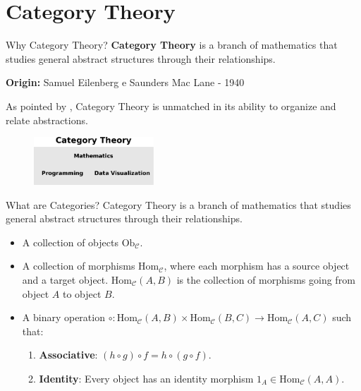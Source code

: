 \documentclass[aspectratio=169,xcolor=dvipsnames,10pt]{beamer}
\theoremstyle{definition}
\begin{document}
\section{Category Theory}
\begin{frame}[fragile]{Why Category Theory?}
	\textbf{Category Theory} is a branch of mathematics that
	studies general abstract structures through their relationships.
	\vspace{3mm}

	\textbf{Origin: }Samuel Eilenberg e Saunders Mac Lane - 1940
	\vspace{3mm}

	As pointed by \citet{fong2019invitation}, Category Theory is unmatched
	in its ability to organize and relate abstractions.

	\vspace{3mm}
	\begin{figure}[H]
		\begin{center}
			\includegraphics[width=0.40\textwidth]{./figures/category-triad.pdf}
		\end{center}
	\end{figure}
\end{frame}

\begin{frame}[fragile]{What are Categories?}
	Category Theory is a branch of mathematics that
	studies general abstract structures through their relationships.

	\begin{definition}[Category]
        \begin{itemize}
            \item A collection of objects $\mathrm{Ob}_{\mathcal{C}}$.
            \item A collection of morphisms $\mathrm{Hom}_{\mathcal{C}}$, where each morphism has a source object and a target object. $\mathrm{Hom}_{\mathcal{C}}(A, B)$ is the collection of morphisms going from object $A$ to object $B$.
            \item A binary operation $\circ : \mathrm{Hom}_{\mathcal{C}}(A, B) \times \mathrm{Hom}_{\mathcal{C}}(B, C) \to \mathrm{Hom}_{\mathcal{C}}(A, C)$ such that:
            \begin{enumerate}
                \item \textbf{Associative}: $(h \circ g) \circ f = h \circ (g \circ f)$.
                \item \textbf{Identity}: Every object has an identity morphism $1_A \in \mathrm{Hom}_{\mathcal{C}}(A, A)$.
            \end{enumerate}
        \end{itemize}
	\end{definition}
\end{frame}
\end{document}
